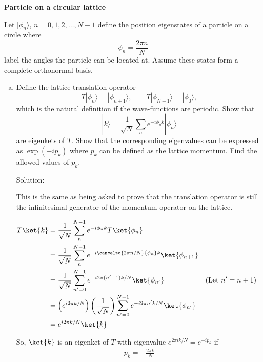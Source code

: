 \newpage
\begin{homeworkProblem}
    \textbf{Particle on a circular lattice}

    Let $|\phi_n\rangle$, $n=0,1,2,\ldots,N-1$ define the position eigenstates of a particle on a circle where
    \[
        \phi_n = \frac{2\pi n}{N}
    \]
    label the angles the particle can be located at. Assume these states form a complete orthonormal basis.

    \begin{enumerate}[(a)]
        \item Define the lattice translation operator
            \[
                T|\phi_n\rangle = |\phi_{n+1}\rangle, \qquad T|\phi_{N-1}\rangle = |\phi_0\rangle,
            \]
            which is the natural definition if the wave-functions are periodic. Show that
            \[
                |k\rangle = \frac{1}{\sqrt{N}} \sum_n e^{-i\phi_n k}|\phi_n\rangle
            \]
            are eigenkets of $T$. Show that the corresponding eigenvalues can be expressed as $\exp(-ip_k)$ where $p_k$ can be defined as the lattice momentum. Find the allowed values of $p_k$.
            \begin{callout}{Solution:}

                This is the same as being asked to prove that the translation operator is still the infinitesimal generator of the momentum operator on the lattice.

                \begin{align*}
                    T\ket{k} &= \frac{1}{\sqrt{N}} \sum_n^{N-1} e^{-i\phi_n k } T\ket{\phi_n} \\ 
                             &= \frac{1}{\sqrt{N}} \sum_n^{N-1} e^{-i\cancelto{2\pi n / N}{\phi_n} k } \ket{\phi_{n+1}} \\ 
                             &= \frac{1}{\sqrt{N}} \sum_{n'=0}^{N-1} e^{-i 2 \pi (n'-1) k / N } \ket{\phi_{n'}} &&\text{(Let $n'=n+1$)} \\ 
                             &= \left( e^{i 2 \pi k / N } \right)\left( \frac{1}{\sqrt{N}} \right) \sum_{n'=0}^{N-1} e^{-i 2 \pi n' k / N } \ket{\phi_{n'}} \\ 
                             &=  e^{i 2 \pi k / N } \ket{k}
                \end{align*}

                So, $\ket{k}$ is an eigenket of $T$ with eigenvalue $e^{2\pi i k / N}=e^{-ip_k}$ if 
                \begin{align*}
                    \boxed{p_k=-\frac{2\pi k}{N}}
                \end{align*}


\end{callout}
\end{enumerate}
\end{homeworkProblem}
